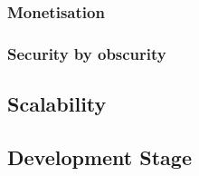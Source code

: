 \subsubsection{Monetisation}

\subsubsection{Security by obscurity}

\subsection{Scalability}

\subsection{Development Stage}
